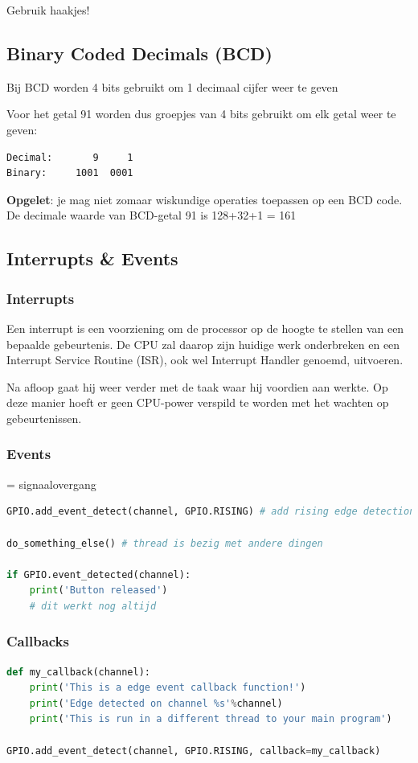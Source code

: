 \documentclass{article}
\newcommand{\bold}[1]{\textbf{#1}}
\begin{document}
Gebruik haakjes!

\subsection{Binary Coded Decimals (BCD)}
Bij BCD worden 4 bits gebruikt om 1 decimaal cijfer weer te geven

Voor het getal 91 worden dus groepjes van 4 bits gebruikt om elk getal weer te geven:
\begin{lstlisting}
Decimal:       9     1
Binary:     1001  0001
\end{lstlisting}

\bold{Opgelet}: je mag niet zomaar wiskundige operaties toepassen op een BCD code.
De decimale waarde van BCD-getal 91 is 128+32+1 = 161

\subsection{Interrupts \& Events}
\subsubsection{Interrupts}
Een interrupt is een voorziening om de processor op de hoogte te stellen van een bepaalde
gebeurtenis. 
De CPU zal daarop zijn huidige werk onderbreken en een Interrupt Service Routine (ISR),
ook wel Interrupt Handler genoemd, uitvoeren. 

Na afloop gaat hij weer verder met de taak waar hij
voordien aan werkte. Op deze manier hoeft er geen CPU-power verspild te worden met het
wachten op gebeurtenissen.

\subsubsection{Events}
= signaalovergang

\begin{lstlisting}[language=Python]
GPIO.add_event_detect(channel, GPIO.RISING) # add rising edge detection

do_something_else() # thread is bezig met andere dingen

if GPIO.event_detected(channel):
    print('Button released')
    # dit werkt nog altijd
\end{lstlisting}


\subsubsection{Callbacks}
\begin{lstlisting}[language=Python]
def my_callback(channel):
    print('This is a edge event callback function!')
    print('Edge detected on channel %s'%channel)
    print('This is run in a different thread to your main program')

GPIO.add_event_detect(channel, GPIO.RISING, callback=my_callback)
\end{lstlisting}
\end{document}
